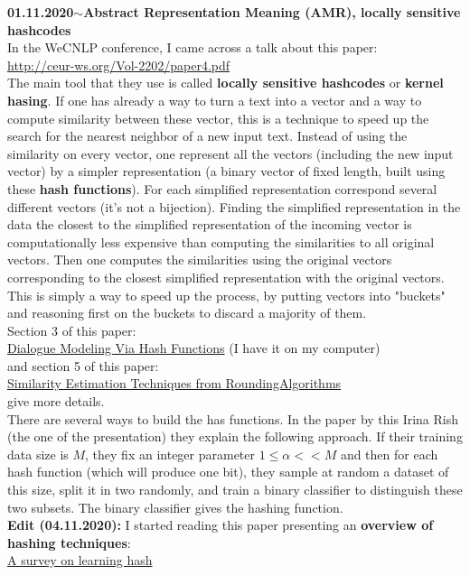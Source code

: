 \documentclass[11pt,a4paper]{article}
\newenvironment{loggentry}[2]%
{\noindent\textbf{#1}\hspace{1cm}$\mathbf{\sim}$\text{ }\textbf{#2}\\}{\vspace{0.5cm}}
\begin{document}
\begin{loggentry}{01.11.2020}{Abstract Representation Meaning (AMR), locally sensitive hashcodes}
In the WeCNLP conference, I came across a talk about this paper:\\
\url{http://ceur-ws.org/Vol-2202/paper4.pdf}\\
The main tool that they use is called \textbf{locally sensitive hashcodes} or \textbf{kernel hasing}. If one has already a way to turn a text into a vector and a way to compute similarity between these vector, this is a technique to speed up the search for the nearest neighbor of a new input text. Instead of using the similarity on every vector, one represent all the vectors (including the new input vector) by a simpler representation (a binary vector of fixed length, built using these \textbf{hash functions}). For each simplified representation correspond several different vectors (it's not a bijection). Finding the simplified representation in the data the closest to the simplified representation of the incoming vector is computationally less expensive than computing the similarities to all original vectors. Then one computes the similarities using the original vectors corresponding to the closest simplified representation with the original vectors. This is simply a way to speed up the process, by putting vectors into "buckets" and reasoning first on the buckets to discard a majority of them.\\
Section 3 of this paper:\\
\href{http://ceur-ws.org/Vol-2202/paper4.pdf}{Dialogue Modeling Via Hash Functions} (I have it on my computer)\\
and section 5 of this paper:\\
\href{https://www.cs.princeton.edu/courses/archive/spr04/cos598B/bib/CharikarEstim.pdf}{Similarity Estimation Techniques from RoundingAlgorithms}\\
give more details.\\
There are several ways to build the has functions. In the paper by this Irina Rish (the one of the presentation) they explain the following approach. If their training data size is $M$, they fix an integer parameter $1\leq \alpha << M$ and then for each hash function (which will produce one bit), they sample at random a dataset of this size, split it in two randomly, and train a binary classifier to distinguish these two subsets. The binary classifier gives the hashing function.\\
\textbf{Edit (04.11.2020):} I started reading this paper presenting an \textbf{overview of hashing techniques}:\\
\href{https://jingdongwang2017.github.io/Pubs/LTHSurvey.pdf}{A survey on learning hash}\\

\end{loggentry}
\end{document}
